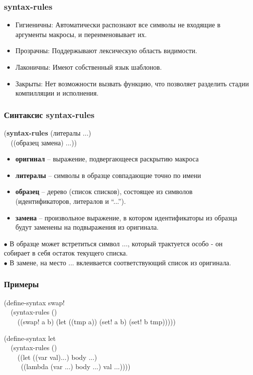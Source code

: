 \documentclass[16pt,pdf,unicode]{beamer}
\begin{document}
\begin{frame}
\frametitle{syntax-rules}
\begin{itemize}
  \item Гигиеничны:
    Автоматически распознают все символы не входящие в аргументы макросы, и переименовывает их.
  \item Прозрачны:
    Поддержывают лексическую область видимости.
  \item Лаконичны:
    Имеют собственный язык шаблонов.
  \item Закрыты:
    Нет возможности вызвать функцию, что позволяет разделить стадии компилляции и исполнения.
\end{itemize}
\end{frame}

\begin{frame}
\frametitle{Синтаксис syntax-rules}
\begin{block}{}
({\bf syntax-rules} (литералы ...)\\
\ \ ((образец замена) ...))
\end{block}
\begin{itemize}
  \item {\bf оригинал} -- выражение, подвергающееся раскрытию макроса
  \item {\bf литералы} -- символы в образце совпадающие точно по имени
  \item {\bf образец} -- дерево (список списков), состоящее из символов (идентификаторов, литералов и ``...'').
  \item {\bf замена} -- произвольное выражение, в котором идентификаторы из образца будут заменены на подвыражения из оригинала.
\end{itemize}
$\bullet$ В образце может встретиться символ ..., который трактуется особо - он собирает в себя остаток текущего списка.\\
$\bullet$ В замене, на место ... вклеивается соответствующий список из оригинала.
\end{frame}

\begin{frame}
\frametitle{Примеры}
\begin{block}{}
  (define-syntax swap!\\
  \ \ (syntax-rules ()\\
  \ \ \ \ ((swap! a b) (let ((tmp a)) (set! a b) (set! b tmp)))))
\end{block}

\begin{block}{}
  (define-syntax let\\
  \ \ (syntax-rules ()\\
  \ \ \ \ ((let ((var val)...) body ...)\\
  \ \ \ \ \ ((lambda (var ...) body ...) val ...))))
\end{block}

\end{frame}
\end{document}
